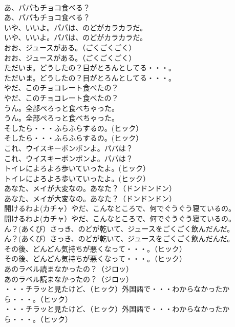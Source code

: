 \documentclass[8pt]{extreport}
\begin{document}
\begin{CJK}{UTF8}{min}
\\	あ、パパもチョコ食べる？	
\\	あ、パパもチョコ食べる？ 
\\	いや、いいよ。パパは、のどがカラカラだ。	
\\	いや、いいよ。パパは、のどがカラカラだ。 
\\	おお、ジュースがある。（ごくごくごく）	
\\	おお、ジュースがある。（ごくごくごく） 
\\	ただいま。どうしたの？目がとろんとしてる・・・。	
\\	ただいま。どうしたの？目がとろんとしてる・・・。 
\\	やだ、このチョコレート食べたの？	
\\	やだ、このチョコレート食べたの？ 
\\	うん。全部ぺろっと食べちゃった。	
\\	うん。全部ぺろっと食べちゃった。 
\\	そしたら・・・ふらふらするの。(ヒック）	
\\	そしたら・・・ふらふらするの。(ヒック） 
\\	これ、ウイスキーボンボンよ。パパは？	
\\	これ、ウイスキーボンボンよ。パパは？ 
\\	トイレによろよろ歩いていったよ。(ヒック）	
\\	トイレによろよろ歩いていったよ。(ヒック） 
\\	あなた、メイが大変なの。あなた？（ドンドンドン）	
\\	あなた、メイが大変なの。あなた？（ドンドンドン） 
\\	開けるわよ(カチャ）やだ、こんなところで、何でぐうぐう寝ているの。	
\\	開けるわよ(カチャ）やだ、こんなところで、何でぐうぐう寝ているの。 
\\	ん？(あくび）さっき、のどが乾いて、ジュースをごくごく飲んだんだ。	
\\	ん？(あくび）さっき、のどが乾いて、ジュースをごくごく飲んだんだ。 
\\	その後、どんどん気持ちが悪くなって・・・。（ヒック）	
\\	その後、どんどん気持ちが悪くなって・・・。（ヒック） 
\\	あのラベル読まなかったの？（ジロッ）	
\\	あのラベル読まなかったの？（ジロッ） 
\\	・・・チラッと見たけど、（ヒック）外国語で・・・わからなかったから・・・。（ヒック）	
\\	・・・チラッと見たけど、（ヒック）外国語で・・・わからなかったから・・・。（ヒック） 

\end{CJK}
\end{document}
